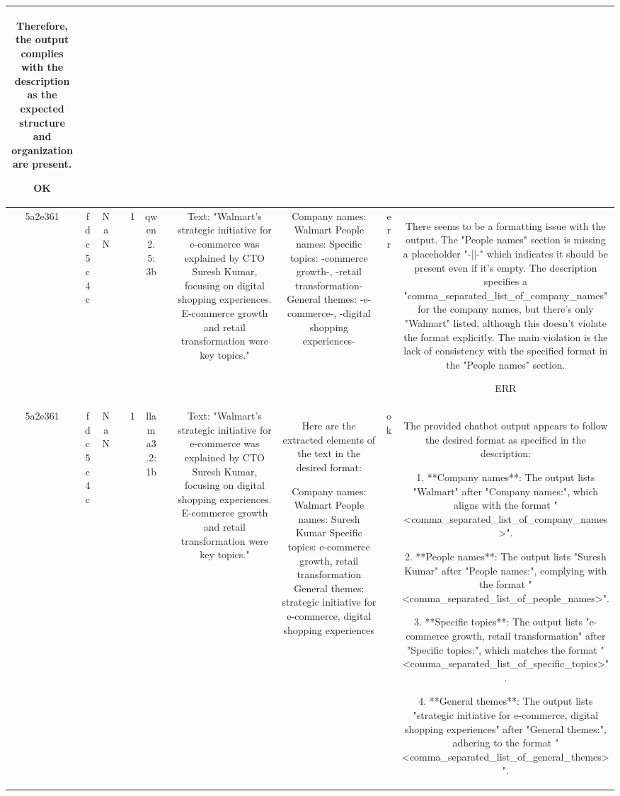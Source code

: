 \begin{table}[h!]
\begin{tabular}{|c|c|c|c|c|c|c|c|c|c|c|}
Therefore, the output complies with the description as the expected structure and organization are present.

OK\\
\hline
5a2e361 & fdc5c4c & NaN &  & 1 & qwen2.5:3b &  & Text: "Walmart's strategic initiative for e-commerce was explained by CTO Suresh Kumar, focusing on digital shopping experiences. E-commerce growth and retail transformation were key topics." & Company names: Walmart
People names: 
Specific topics: -commerce growth-, -retail transformation-
General themes: -e-commerce-, -digital shopping experiences- & err & There seems to be a formatting issue with the output. The "People names" section is missing a placeholder "-||-" which indicates it should be present even if it's empty. The description specifies a "comma_separated_list_of_company_names" for the company names, but there's only "Walmart" listed, although this doesn't violate the format explicitly. The main violation is the lack of consistency with the specified format in the "People names" section.

ERR\\
\hline
5a2e361 & fdc5c4c & NaN &  & 1 & llama3.2:1b &  & Text: "Walmart's strategic initiative for e-commerce was explained by CTO Suresh Kumar, focusing on digital shopping experiences. E-commerce growth and retail transformation were key topics." & Here are the extracted elements of the text in the desired format:

Company names: Walmart
People names: Suresh Kumar
Specific topics: e-commerce growth, retail transformation
General themes: strategic initiative for e-commerce, digital shopping experiences & ok & The provided chatbot output appears to follow the desired format as specified in the description:

1. **Company names**: The output lists "Walmart" after "Company names:", which aligns with the format "<comma_separated_list_of_company_names>".

2. **People names**: The output lists "Suresh Kumar" after "People names:", complying with the format "<comma_separated_list_of_people_names>".

3. **Specific topics**: The output lists "e-commerce growth, retail transformation" after "Specific topics:", which matches the format "<comma_separated_list_of_specific_topics>".

4. **General themes**: The output lists "strategic initiative for e-commerce, digital shopping experiences" after "General themes:", adhering to the format "<comma_separated_list_of_general_themes>".


\end{tabular}
\end{table}
